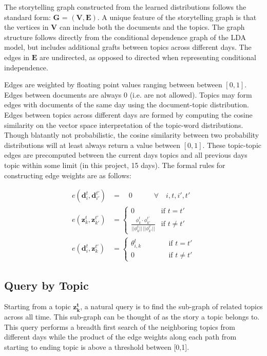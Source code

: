 \documentclass[10pt]{article}
\begin{document}
The storytelling graph constructed from the learned distributions follows the standard form: $\mathbf{G}$ = $(\mathbf{V}, \mathbf{E})$.  A unique feature of the storytelling graph is that the vertices in $\mathbf{V}$ can include both the documents and the topics.  The graph structure follows directly from the conditional dependence graph of the LDA model, but includes additional grafts between topics across different days.  The edges in $\mathbf{E}$ are undirected, as opposed to directed when representing conditional independence.

Edges are weighted by floating point values ranging between between $[0, 1]$.  Edges between documents are always 0 (i.e. are not allowed).  Topics may form edges with documents of the same day using the document-topic distribution.  Edges between topics across different days are formed by computing the cosine similarity on the vector space interpretation of the topic-word distributions.  Though blatantly not probabilistic, the cosine similarity between two probability distributions will at least always return a value between $[0,1]$. These topic-topic edges are precomputed between the current days topics and all previous days topic within some limit (in this project, 15 days).  The formal rules for constructing edge weights are as follows:  

\begin{align}
  e(\mathbf{d}_i^t, \mathbf{d}_{i'}^{t'}) &= \quad 0 \qquad\quad \forall \quad i, t, i', t'\\
  e(\mathbf{z}_k^t, \mathbf{z}_{k'}^{t'}) &= \begin{cases}
      0 & \text{if $t=t'$} \\
      \frac{\phi_k^t \cdot \phi_{k'}^{t'}}{||\phi_k^t||\,||\phi_{k'}^{t'}||} & \text{if $t \ne t'$}
    \end{cases} \\
  e(\mathbf{d}_i^t, \mathbf{z}_{k}^{t'}) &= \begin{cases}
      \theta_{i,k}^t & \qquad\quad \text{if $t =t'$} \\
      0 & \qquad\quad \text{if $t \ne t'$}
    \end{cases}
\end{align}

\subsection {Query by Topic}

Starting from a topic $\mathbf{z_k^t}$, a natural query is to find the sub-graph of related topics across all time.  This sub-graph can be thought of as the story a topic belongs to.  This query performs a breadth first search of the neighboring topics from different days while the product of the edge weights along each path from starting to ending topic is above a threshold between [0,1].   
\end{document}
